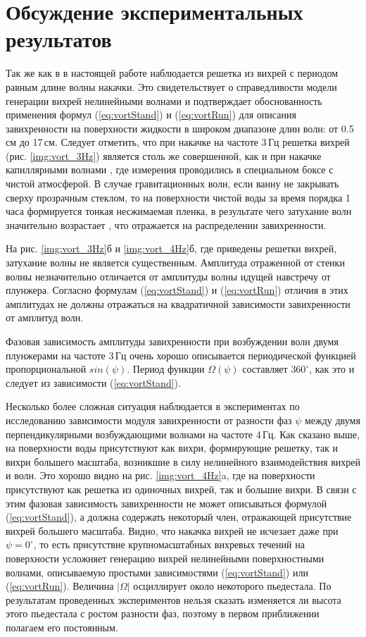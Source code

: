 \section{Обсуждение экспериментальных результатов} \label{sect4_4}
Так же как в \cite{F5, F6} в настоящей работе наблюдается решетка из вихрей с периодом равным длине волны накачки. Это свидетельствует о справедливости модели генерации вихрей нелинейными волнами и подтверждает обоснованность применения формул (\ref{eq:vortStand}) и (\ref{eq:vortRun}) для описания завихренности на поверхности жидкости в широком диапазоне длин волн: от 0.5\,см до 17\,см. Следует отметить, что при накачке на частоте 3\,Гц решетка вихрей (рис. \ref{img:vort_3Hz}) является столь же совершенной, как и при накачке капиллярными волнами \cite{F6}, где измерения проводились в специальном боксе с чистой атмосферой. В случае гравитационных волн, если ванну не закрывать сверху прозрачным стеклом, то на поверхности чистой воды за время порядка 1 часа формируется тонкая несжимаемая пленка, в результате чего затухание волн значительно возрастает \cite{land}, что отражается на распределении завихренности.

На рис. \ref{img:vort_3Hz}б и \ref{img:vort_4Hz}б, где приведены решетки вихрей, затухание волны не является существенным. Амплитуда отраженной от стенки волны незначительно отличается от амплитуды волны идущей навстречу от плунжера. Согласно формулам (\ref{eq:vortStand}) и (\ref{eq:vortRun}) отличия в этих амплитудах не должны отражаться на квадратичной зависимости завихренности от амплитуд волн. 

Фазовая зависимость амплитуды завихренности при возбуждении волн двумя плунжерами на частоте 3\,Гц очень хорошо описывается периодической функцией пропорциональной $sin(\psi)$. Период функции $\Omega (\psi)$ составляет $360^\circ$, как это и следует из зависимости (\ref{eq:vortStand}). 

Несколько более сложная ситуация наблюдается в экспериментах по исследованию зависимости модуля завихренности от разности фаз $\psi$ между двумя перпендикулярными возбуждающими волнами на частоте 4\,Гц. Как сказано выше, на поверхности воды присутствуют как вихри, формирующие решетку, так и вихри большего масштаба, возникшие в силу нелинейного взаимодействия вихрей и волн. Это хорошо видно на рис. \ref{img:vort_4Hz}a, где на поверхности присутствуют как решетка из одиночных вихрей, так и большие вихри. В связи с этим фазовая зависимость завихренности не может описываться формулой (\ref{eq:vortStand}), а должна содержать некоторый член, отражающей присутствие вихрей большего масштаба. Видно, что накачка вихрей не исчезает даже при $\psi=0^\circ$, то есть присутствие крупномасштабных вихревых течений на поверхности усложняет генерацию вихрей нелинейными поверхностными волнами, описываемую простыми зависимостями (\ref{eq:vortStand}) или (\ref{eq:vortRun}). Величина $|\Omega|$ осциллирует около некоторого пьедестала. По результатам проведенных экспериментов нельзя сказать изменяется ли высота этого пьедестала с ростом разности фаз, поэтому в первом приближении полагаем его постоянным. 

